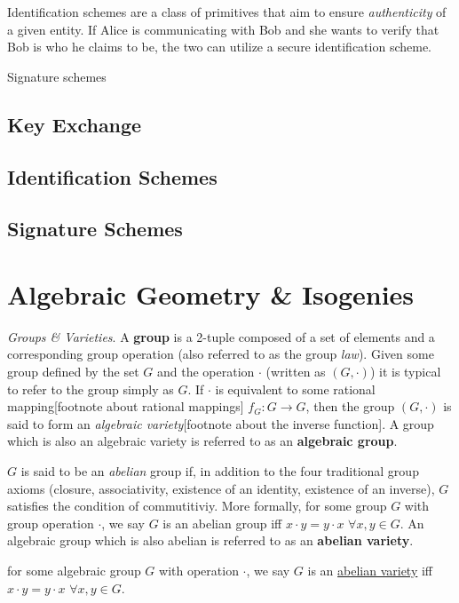 Identification schemes are a class of primitives that aim to ensure \emph{authenticity} of a given entity. If Alice is communicating with Bob and she wants to verify that Bob is who he claims to be, the two can utilize a secure identification scheme.

Signature schemes

\subsection{Key Exchange}

\subsection{Identification Schemes}

\subsection{Signature Schemes}

\section{Algebraic Geometry \& Isogenies}
\emph{Groups \& Varieties}. A \textbf{group} is a 2-tuple composed of a set of elements and a corresponding group operation (also referred to as the group \emph{law}). Given some group defined by the set $G$ and the operation $\cdot$ (written as $(G,\cdot)$) it is typical to refer to the group simply as $G$. If $\cdot$ is equivalent to some rational mapping[footnote about rational mappings] $f_G: G \rightarrow G$, then the group $(G,\cdot)$ is said to form an \textit{algebraic variety}[footnote about the inverse function]. A group which is also an algebraic variety is referred to as an \textbf{algebraic group}.

$G$ is said to be an \emph{abelian} group if, in addition to the four traditional group axioms (closure, associativity, existence of an identity, existence of an inverse), $G$ satisfies the condition of commutitiviy. More formally, for some group $G$ with group operation $\cdot$, we say $G$ is an abelian group iff $x \cdot y = y \cdot x$ $\forall x, y \in G$. An algebraic group which is also abelian is referred to as an \textbf{abelian variety}.

\begin{tcolorbox}
\begin{definition}
\label{defn:abelianvariety}
for some algebraic group $G$ with operation $\cdot$, we say $G$ is an \underline{abelian variety} iff $x \cdot y = y \cdot x$ $\forall x, y \in G$. 
\end{definition}
\end{tcolorbox}

